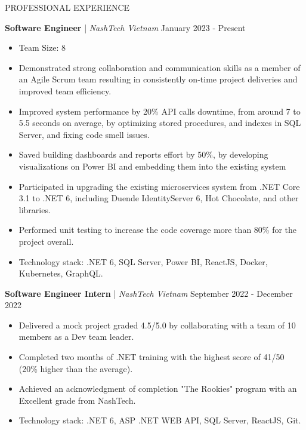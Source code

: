 \begin{rSection}{PROFESSIONAL EXPERIENCE}

    \quad\textbf{Software Engineer} | \textit{NashTech Vietnam} \hfill January 2023 - Present\\
    \begin{itemize}
        \itemsep 0pt {} \vspace{-1em}
        \item Team Size: 8
        \item Demonstrated strong collaboration and communication skills as a member of an Agile Scrum team
              resulting in consistently on-time project deliveries and improved team efficiency.
        \item Improved system performance by 20\% API calls downtime, from around 7 to 5.5 seconds on average,
              by optimizing stored procedures, and indexes in SQL Server, and fixing code smell issues.
        \item Saved building dashboards and reports effort by 50\%, by developing visualizations on Power BI and embedding them into the existing system
        \item Participated in upgrading the existing microservices system from .NET Core 3.1 to .NET 6,
              including Duende IdentityServer 6, Hot Chocolate, and other libraries.
        \item Performed unit testing to increase the code coverage more than 80\% for the project overall.
        \item Technology stack: .NET 6, SQL Server, Power BI, ReactJS, Docker, Kubernetes, GraphQL.
    \end{itemize}

    \vspace{1em}

    \quad\textbf{Software Engineer Intern} | \textit{NashTech Vietnam} \hfill September 2022 - December 2022\\
    \begin{itemize}
        \itemsep 0pt {} \vspace{-1em}
        \item Delivered a mock project graded 4.5/5.0 by collaborating with a team of 10 members as a Dev team leader.
        \item Completed two months of .NET training with the highest score of 41/50 (20\% higher than the average).
        \item Achieved an acknowledgment of completion "The Rookies" program with an Excellent grade from NashTech.
        \item Technology stack: .NET 6, ASP .NET WEB API, SQL Server, ReactJS, Git.
    \end{itemize}


\end{rSection}
